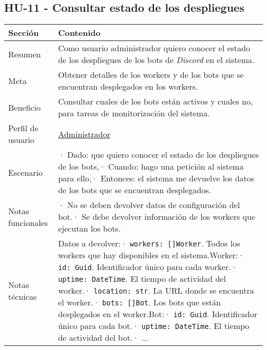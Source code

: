 \subsection{HU-11 - Consultar estado de los despliegues}
\label{sec:hu11}

\begin{table}[H]
    \centering
    \def\arraystretch{1.25}
    \begin{adjustbox}{max width=\textwidth}
    \begin{tabularx}{\textwidth}{|l|L|}
    \hline
        \textbf{Sección} & \textbf{Contenido} \\ \hline
    \hline
        Resumen & Como usuario administrador quiero conocer el estado de los despliegues de los bots de \textit{Discord} en el sistema. \\ \hline
        Meta & Obtener detalles de los workers y de los bots que se encuentran desplegados en los workers. \\ \hline
        Beneficio & Consultar cuales de los bots están activos y cuales no, para tareas de monitorización del sistema. \\ \hline
        Perfil de usuario & \hyperref[sec:personaAdmin]{Administrador} \\ \hline
        Escenario & · Dado: que quiero conocer el estado de los despliegues de los bots,\linebreak · Cuando: hago una petición al sistema para ello,\linebreak · Entonces: el sistema me devuelve los datos de los bots que se encuentran desplegados. \\ \hline
        Notas funcionales & · No se deben devolver datos de configuración del bot.\linebreak · Se debe devolver información de los workers que ejecutan los bots. \\ \hline
        Notas técnicas & Datos a devolver:\linebreak · \verb|workers: []Worker|. Todos los workers que hay disponibles en el sistema.\linebreak \linebreak Worker:\linebreak · \verb|id: Guid|. Identificador único para cada worker.\linebreak · \verb|uptime: DateTime|. El tiempo de actividad del worker.\linebreak · \verb|location: str|. La URL donde se encuentra el worker.\linebreak · \verb|bots: []Bot|. Los bots que están desplegados en el worker.\linebreak \linebreak Bot:\linebreak · \verb|id: Guid|. Identificador único para cada bot.\linebreak · \verb|uptime: DateTime|. El tiempo de actividad del bot.\linebreak · ... \\ \hline

\end{tabularx}
\end{adjustbox}
\end{table}
